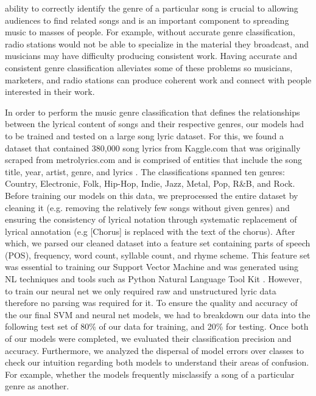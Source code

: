 \documentclass[journal]{IEEEtran}
\begin{document}
 ability to correctly identify the genre of a particular song is crucial to allowing audiences to find related songs and is an important component to spreading music to masses of people. For example, without accurate genre classification, radio stations would not be able to specialize in the material they broadcast, and musicians may have difficulty producing consistent work. Having accurate and consistent genre classification alleviates some of these problems so musicians, marketers, and radio stations can produce coherent work and connect with people interested in their work. 
\par In order to perform the music genre classification that defines the relationships between the lyrical content of songs and their respective genres, our models had to be trained and tested on a large song lyric dataset. For this, we found a dataset that contained 380,000 song lyrics from Kaggle.com that was originally scraped from metrolyrics.com and is comprised of entities that include the song title, year, artist, genre, and lyrics \cite{KaggleDataset}. The classifications spanned ten genres: Country, Electronic, Folk, Hip-Hop, Indie, Jazz, Metal, Pop, R\&B, and Rock. Before training our models on this data, we preprocessed the entire dataset by cleaning it (e.g. removing the relatively few songs without given genres) and ensuring the consistency of lyrical notation through systematic replacement of lyrical annotation (e.g [Chorus] is replaced with the text of the chorus). After which, we parsed our cleaned dataset into a feature set containing parts of speech (POS), frequency, word count, syllable count, and rhyme scheme. This feature set was essential to training our Support Vector Machine and was generated using NL techniques and tools such as Python Natural Language Tool Kit \cite{NLTK}. However, to train our neural net we only required raw and unstructured lyric data therefore no parsing was required for it. To ensure the quality and accuracy of the our final SVM and neural net models, we had to breakdown our data into the following test set of 80\% of our data for training, and 20\% for testing. Once both of our models were completed, we evaluated their classification precision and accuracy. Furthermore, we analyzed the dispersal of model errors over classes to check our intuition regarding both models to understand their areas of confusion. For example, whether the models frequently misclassify a song of a particular genre as another. \par
\end{document}
